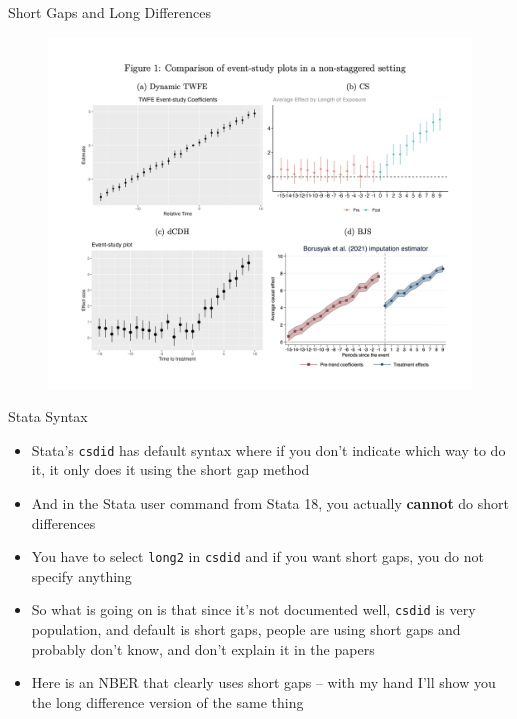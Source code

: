 \documentclass{beamer}
\begin{document}
\begin{frame}{Short Gaps and Long Differences}

\begin{figure}[h]
    \centering
    \includegraphics[width=\linewidth, height=0.8\textheight, keepaspectratio]{./lecture_includes/shortgap}
\end{figure}

\end{frame}

\begin{frame}{Stata Syntax}

\begin{itemize}

\item Stata's \texttt{csdid} has default syntax where if you don't indicate which way to do it, it only does it using the short gap method
\item And in the Stata user command from Stata 18, you actually \textbf{cannot} do short differences 
\item You have to select \texttt{long2} in \texttt{csdid} and if you want short gaps, you do not specify anything
\item So what is going on is that since it's not documented well, \texttt{csdid} is very population, and default is short gaps, people are using short gaps and probably don't know, and don't explain it in the papers
\item Here is an NBER that clearly uses short gaps -- with my hand I'll show you the long difference version of the same thing
\end{itemize}

\end{frame}
\end{document}
